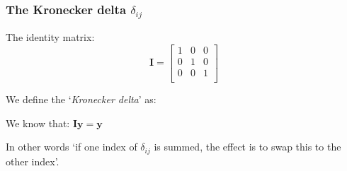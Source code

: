 \documentclass[notes]{beamer}
\begin{document}
\begin{frame}
	\frametitle{The Kronecker delta $\delta_{ij}$}
	The identity matrix:
	\begin{equation*}
	\mathbf{I} = 
	\begin{bmatrix}
	1 & 0 & 0 \\
	0 & 1 & 0 \\
	0 & 0 & 1 \\
	\end{bmatrix}
	\end{equation*}
	
	We define the `\textit{Kronecker delta}' as:
	\mode<handout>{
		\vspace{1.5cm}
	} 
	
	We know that: $\mathbf{Iy} = \mathbf{y}$
	
	In other words ‘if one index of $\delta_{ij}$ is summed, the effect is to swap this to the other
	index’.
\end{frame}
\end{document}

